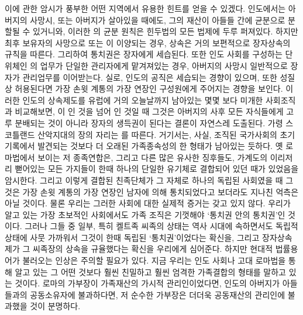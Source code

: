 이에 관한 암시가 풍부한 어떤 지역에서 유용한 힌트를 얻을 수 있겠다.
인도에서는
아버지의 사망시, 또는 아버지가 살아있을 때에도,
그의 재산이 아들들 간에 균분으로 분할될 수 있거니와,
이러한 의 균분 원칙은 힌두법의 모든 법제에
두루 퍼져있다.
하지만 최후 보유자의 사망으로  또는 이
이양되는 경우, 상속은 거의 보편적으로 장자상속의 규칙을 따른다.
그리하여 통치권은 장자에게 세습된다.
또한 인도 사회를 구성하는 단위체인 의 업무가
단일한 관리자에게 맡겨져있는 경우,
아버지의 사망시
일반적으로 장자가
관리업무를 이어받는다.
실로, 인도의 공직은 세습되는 경향이 있으며, 또한
성질상 허용된다면
가장 손윗 계통의 가장 연장인 구성원에게 주어지는 경향을 보인다.
이러한 인도의 상속제도를
유럽에 거의 오늘날까지 남아있는 몇몇 보다 미개한 사회조직과
비교해보면,
이 인 것을 넘어 인 것일 때
그것은 아버지의 사후 모든 자식들에게 고루 분배되는 것이 아니라
장자의 생득권이 된다는 결론이 자연스레 도출된다.
가령 스코틀랜드 산악지대의 장의 자리는
를 따른다.
거기서는, 사실, 조직된 국가사회의 초기 기록에서 발견되는 것보다
더 오래된 가족종속성의 한 형태가 남아있는 듯하다.
옛 로마법에서 보이는 저 종족연합은,
그리고 다른 많은 유사한 징후들도,
가계도의 이리저리 뻗어있는 모든 가지들이 한때
하나의 단일한 유기체로 결합되어 있던 때가 있었음을 암시한다.
그리고 이렇게 결합된 친족단체가 그 자체로 하나의 독립된 사회였을 때
그것은 가장 손윗 계통의 가장 연장인 남자에 의해 통치되었다고 보더라도
지나친 억측은 아닐 것이다.
물론 우리는 그러한 사회에 대한 실제적 증거는 갖고 있지 않다.
우리가 알고 있는 가장 초보적인 사회에서도
가족 조직은 기껏해야 `통치권 안의 통치권'인 것이다.
그러나 그들 중 일부, 특히 켈트족 씨족의 상태는
역사 시대에 속하면서도 독립적 상태에 사뭇 가까워서
그것이 한때 독립된 `통치권'이었다는 확신을,
그리고 장자상속제가 그 씨족장의 상속을 규율했다는 확신을 우리에게 심어준다.
하지만 현대적 법률용어가 불러오는 인상은 주의할 필요가 있다.
지금 우리는 인도 사회나 고대 로마법을 통해 알고 있는 그 어떤 것보다
훨씬 친밀하고 훨씬 엄격한 가족결합의 형태를 말하고 있는 것이다.
로마의 가부장이 가족재산의 가시적 관리인이었다면,
인도의 아버지가 아들들과의 공동소유자에 불과하다면,
저 순수한 가부장은 더더욱 공동재산의 관리인에 불과했을 것이 분명하다.


